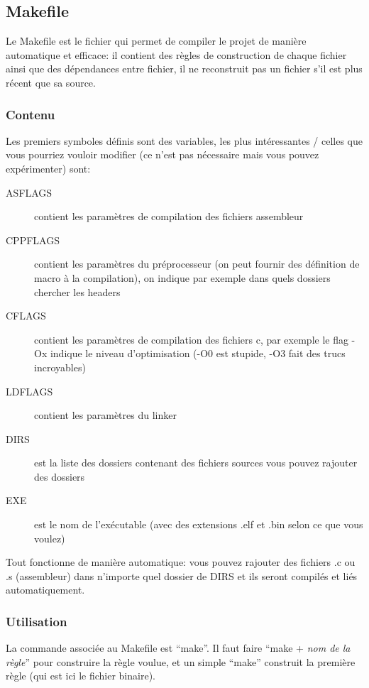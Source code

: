 \documentclass[a4paper,10pt]{article} %
\begin{document}
\subsection{\label{makefile}Makefile}
Le Makefile est le fichier qui permet de compiler le projet de manière automatique et efficace: il contient des règles de construction de chaque fichier ainsi que des dépendances entre fichier, il ne reconstruit pas un fichier s'il est plus récent que sa source.

\subsubsection{Contenu}
Les premiers symboles définis sont des variables, les plus intéressantes / celles que vous pourriez vouloir modifier (ce n'est pas nécessaire mais vous pouvez expérimenter) sont:
\begin{description}
    \item[ASFLAGS] contient les paramètres de compilation des fichiers assembleur
    \item[CPPFLAGS] contient les paramètres du préprocesseur (on peut fournir des définition de macro à la compilation), on indique par exemple dans quels dossiers chercher les headers
    \item[CFLAGS] contient les paramètres de compilation des fichiers c, par exemple le flag -Ox indique le niveau d'optimisation (-O0 est stupide, -O3 fait des trucs incroyables)
    \item[LDFLAGS] contient les paramètres du linker
    \item[DIRS] est la liste des dossiers contenant des fichiers sources vous pouvez rajouter des dossiers
    \item[EXE] est le nom de l’exécutable (avec des extensions .elf et .bin selon ce que vous voulez)
\end{description}

Tout fonctionne de manière automatique: vous pouvez rajouter des fichiers .c ou .s (assembleur) dans n'importe quel dossier de DIRS et ils seront compilés et liés automatiquement.

\subsubsection{Utilisation}
La commande associée au Makefile est ``make''. Il faut faire ``make + \textit{nom de la règle}'' pour construire la règle voulue, et un simple ``make'' construit la première règle (qui est ici le fichier binaire).\\
\end{document}
